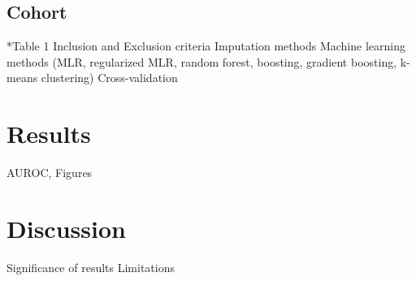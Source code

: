 \documentclass[twoside,10.5pt]{article}
\begin{document}
\subsection{Cohort}
*Table 1
Inclusion and Exclusion criteria 
Imputation methods
Machine learning methods (MLR, regularized MLR, random forest, boosting, gradient boosting, k-means clustering)
Cross-validation


\section{Results}
AUROC, Figures 

\section{Discussion}
Significance of results
Limitations 

\newpage
\theendnotes


\end{document}
